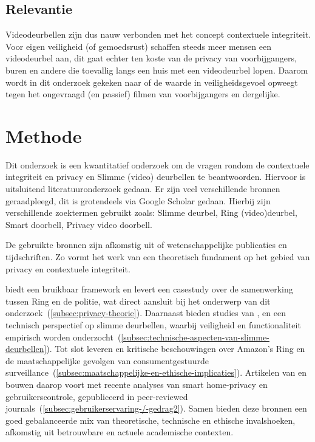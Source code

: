 \documentclass[nonacm, sigconf, balance=true]{acmart}
\begin{document}
    \subsection{Relevantie}
    Videodeurbellen zijn dus nauw verbonden met het concept contextuele integriteit.
    Voor eigen veiligheid (of gemoedsrust) schaffen steeds meer mensen een videodeurbel aan, dit gaat echter ten koste van de privacy van voorbijgangers, buren en andere die toevallig langs een huis met een videodeurbel lopen.
    Daarom wordt in dit onderzoek gekeken naar of de waarde in veiligheidsgevoel opweegt tegen het ongevraagd (en passief) filmen van voorbijgangers en dergelijke.


    \section{Methode}
    Dit onderzoek is een kwantitatief onderzoek om de vragen rondom de contextuele integriteit en privacy en Slimme (video) deurbellen te beantwoorden.
    Hiervoor is uitsluitend literatuuronderzoek gedaan.
    Er zijn veel verschillende bronnen geraadpleegd, dit is grotendeels via Google Scholar gedaan.
    Hierbij zijn verschillende zoektermen gebruikt zoals: Slimme deurbel, Ring (video)deurbel, Smart doorbell, Privacy video doorbell.

    De gebruikte bronnen zijn afkomstig uit of wetenschappelijke publicaties en tijdschriften.
    Zo vormt het werk van \citeauthor{nissenbaum2009privacy} een theoretisch fundament op het gebied van privacy en contextuele integriteit.

    \citeauthor{van2016privacy} biedt een bruikbaar framework en \citeauthor{shaffer2021applying} levert een casestudy over de samenwerking tussen Ring en de politie, wat direct aansluit bij het onderwerp van dit onderzoek~(\ref{subsec:privacy-theorie}).
    Daarnaast bieden studies van \citeauthor{liu2021ethical}, \citeauthor{lalitha2019smart} en \citeauthor{chaudhari2020smart} een technisch perspectief op slimme deurbellen, waarbij veiligheid en functionaliteit empirisch worden onderzocht~(\ref{subsec:technische-aspecten-van-slimme-deurbellen}).
    Tot slot leveren \citeauthor{selinger2022amazon} en \citeauthor{kelly2023ring} kritische beschouwingen over Amazon's Ring en de maatschappelijke gevolgen van consumentgestuurde surveillance~(\ref{subsec:maatschappelijke-en-ethische-implicaties}).
    Artikelen van \citeauthor{shaffer2021applying} en \citeauthor{tabassum2023exploring} bouwen daarop voort met recente analyses van smart home-privacy en gebruikerscontrole, gepubliceerd in peer-reviewed journals~(\ref{subsec:gebruikerservaring-/-gedrag2}).
    Samen bieden deze bronnen een goed gebalanceerde mix van theoretische, technische en ethische invalshoeken, afkomstig uit betrouwbare en actuele academische contexten.
\end{document}
